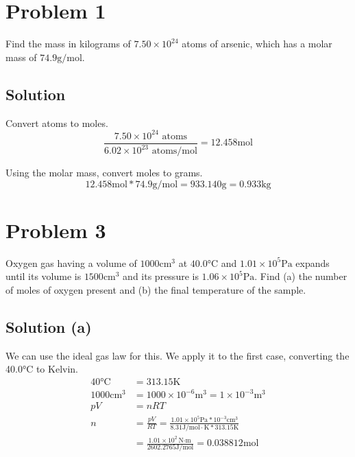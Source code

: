 \documentclass[12pt]{article}
\begin{document}

    \section{Problem 1}
        Find the mass in kilograms of $7.50 \times 10^{24}$ atoms of arsenic, which has a molar mass of $74.9 \unit{\gram/\mole}$.

        \subsection{Solution}
            Convert atoms to moles.
            \begin{equation}
                \frac{7.50 \times 10^{24} \text{ atoms}}{6.02 \times 10^{23} \text{ atoms/mol}} = 12.458 \unit{\mole}
            \end{equation}

            Using the molar mass, convert moles to grams.
            \begin{equation}
                12.458 \unit{\mole} * 74.9 \unit{\gram/\mole} = 933.140 \unit{\gram} = \boxed{0.933 \unit{\kilo\gram}}
            \end{equation}

    \pagebreak
    \section{Problem 3}
        Oxygen gas having a volume of $1000 \unit{\centi\meter^3}$ at $40.0\unit{\celsius}$ and $1.01 \times 10^5 \unit{\pascal}$ expands until its volume is $1500 \unit{\centi\meter^3}$ and its pressure is $1.06 \times 10^5 \unit{\pascal}$. 
        Find (a) the number of moles of oxygen present and (b) the final temperature of the sample.

        \subsection{Solution (a)}
            We can use the ideal gas law for this.
            We apply it to the first case, converting the 40.0\unit{\celsius} to Kelvin.
            \begin{align}
                40\unit{\celsius}   &=  313.15 \unit{\kelvin}\\
                1000 \unit{\centi\meter^3}  &=  1000 \times 10^{-6} \unit{\meter^3} = 1 \times 10^{-3} \unit{\meter^3}\\
                pV  &=  nRT\\
                n   &=  \frac{pV}{RT}
                    =   \frac{1.01 \times 10^5 \unit{\pascal} * 10^{-3} \unit{\centi\meter^3}}{8.31 \unit{\joule/\mole\cdot\kelvin} * 313.15 \unit{\kelvin}}\\
                    &=  \frac{1.01 \times 10^2 \unit{\newton \cdot \meter}}{2602.2765 \unit{\joule/\mole}}
                    =   \boxed{0.038812 \unit{\mole}}
            \end{align}
\end{document}
